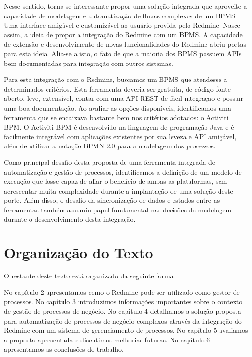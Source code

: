 Nesse sentido, torna-se interessante propor uma solução integrada que aproveite a capacidade de modelagem e automatização de fluxos complexos de um BPMS\cite{bpms}. Uma interface amigável e customizável ao usuário provida pelo Redmine. Nasce assim, a ideia de propor a integração do Redmine com um BPMS\cite{bpms}. A capacidade de extensão e desenvolvimento de novas funcionalidades do Redmine abriu portas para esta ideia. Alia-se a isto, o fato de que a maioria dos BPMS\cite{bpms} possuem APIs\cite{api} bem documentadas para integração com outros sistemas.

Para esta integração com o Redmine, buscamos um BPMS\cite{bpms} que atendesse a determinados critérios. Esta ferramenta deveria ser gratuita, de código-fonte aberto, leve, extensível, contar com uma API\cite{api} REST\cite{rest} de fácil integração e possuir uma boa documentação. Ao avaliar as opções disponíveis, identificamos uma ferramenta que se encaixava bastante bem nos critérios adotados: o Activiti BPM. O Activiti BPM é desenvolvido na linguagem de programação Java\cite{java-history} e é facilmente integrável com aplicações existentes por sua leveza e API\cite{api} amigável, além de utilizar a notação BPMN 2.0\cite{bpmn20} para a modelagem dos processos.

Como principal desafio desta proposta de uma ferramenta integrada de automatização e gestão de processos, identificamos a definição de um modelo de execução que fosse capaz de aliar o benefício de ambas as plataformas, sem acrescentar muita complexidade durante a implantação de uma solução deste porte. Além disso, o desafio da sincronização de dados e estados entre as ferramentas também assumiu papel fundamental nas decisões de modelagem durante o desenvolvimento desta integração.


\section{Organização do Texto}\label{sec:introducao-organizacao_texto}

O restante deste texto está organizado da seguinte forma: 

No capítulo 2 apresentamos como o Redmine pode ser utilizado como gestor de processos. No capítulo 3 introduzimos informações importantes sobre o contexto de gestão de processos de negócio. No capítulo 4 detalhamos a solução proposta para automatização de processos de negócio complexos através da integração do Redmine com um sistema de gerenciamento de processos. No capítulo 5 avaliamos a proposta apresentada e discutimos melhorias futuras. No capítulo 6 apresentamos as conclusões do trabalho.